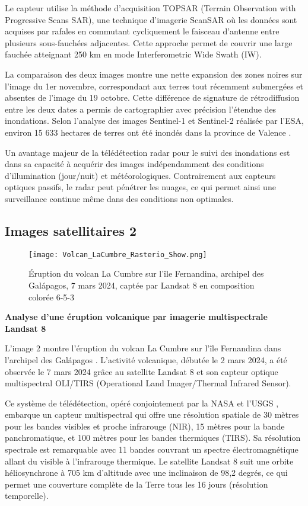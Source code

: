 \documentclass[12pt,a4paper]{article}
\begin{document}
Le capteur utilise la méthode d'acquisition TOPSAR (Terrain Observation with Progressive Scans SAR), une technique d'imagerie ScanSAR où les données sont acquises par rafales en commutant cycliquement le faisceau d'antenne entre plusieurs sous-fauchées adjacentes. Cette approche permet de couvrir une large fauchée atteignant 250 km en mode Interferometric Wide Swath (IW).

La comparaison des deux images montre une nette expansion des zones noires sur l'image du 1er novembre, correspondant aux terres tout récemment submergées et absentes de l'image du 19 octobre. Cette différence de signature de rétrodiffusion entre les deux dates a permis de cartographier avec précision l'étendue des inondations. Selon l'analyse des images Sentinel-1 et Sentinel-2 réalisée par l'ESA, environ 15 633 hectares de terres ont été inondés dans la province de Valence \citep{ESA2024}.

Un avantage majeur de la télédétection radar pour le suivi des inondations est dans sa capacité à acquérir des images indépendamment des conditions d'illumination (jour/nuit) et météorologiques. Contrairement aux capteurs optiques passifs, le radar peut pénétrer les nuages, ce qui permet ainsi une surveillance continue même dans des conditions non optimales.

\subsection{Images satellitaires 2}

\begin{figure}[H]
    \centering
    \texttt{[image: Volcan\_LaCumbre\_Rasterio\_Show.png]}
    \caption{Éruption du volcan La Cumbre sur l'île Fernandina, archipel des Galápagos, 7 mars 2024, captée par Landsat 8 en composition colorée 6-5-3}
    \label{fig:image2}
\end{figure}

\textbf{Analyse d'une éruption volcanique par imagerie multispectrale Landsat 8}

L'image 2 montre l'éruption du volcan La Cumbre sur l'île Fernandina dans l'archipel des Galápagos \citep{NASA2024}. L'activité volcanique, débutée le 2 mars 2024, a été observée le 7 mars 2024 grâce au satellite Landsat 8 et son capteur optique multispectral OLI/TIRS (Operational Land Imager/Thermal Infrared Sensor).

Ce système de télédétection, opéré conjointement par la NASA et l'USGS \citep{USGS2022}, embarque un capteur multispectral qui offre une résolution spatiale de 30 mètres pour les bandes visibles et proche infrarouge (NIR), 15 mètres pour la bande panchromatique, et 100 mètres pour les bandes thermiques (TIRS). Sa résolution spectrale est remarquable avec 11 bandes couvrant un spectre électromagnétique allant du visible à l'infrarouge thermique. Le satellite Landsat 8 suit une orbite héliosynchrone à 705 km d'altitude avec une inclinaison de 98,2 degrés, ce qui permet une couverture complète de la Terre tous les 16 jours (résolution temporelle).
\end{document}
